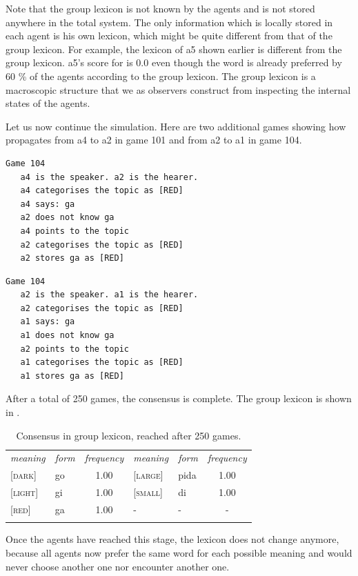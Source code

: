 Note that the group lexicon is not known by the agents
and is not stored anywhere in the 
total system. The only information which is locally stored in each 
agent is his own lexicon, which might be quite different from that 
of the group lexicon. For example, the lexicon of {\bfshape a5} shown earlier
is different from the group lexicon.
{\bfshape a5}'s score for  is 0.0
even though the word is already preferred by 60 \% of 
the agents according to the group lexicon. 
The group lexicon is a macroscopic structure that we
as observers construct from inspecting the internal 
states of the agents. 

Let us now continue the simulation. Here are two additional
games showing how  propagates from {\bfshape a4} to {\bfshape a2} in 
game 101 and from {\bfshape a2} to {\bfshape a1} in game 104. 
\begin{verbatim}
Game 104
   a4 is the speaker. a2 is the hearer. 
   a4 categorises the topic as [RED]
   a4 says: ga
   a2 does not know ga
   a4 points to the topic
   a2 categorises the topic as [RED]
   a2 stores ga as [RED]
\end{verbatim}
\begin{verbatim}
Game 104
   a2 is the speaker. a1 is the hearer. 
   a2 categorises the topic as [RED]
   a1 says: ga
   a1 does not know ga
   a2 points to the topic
   a1 categorises the topic as [RED]
   a1 stores ga as [RED]
\end{verbatim}
After a total of 250 games, the consensus is complete. 
The group lexicon is shown in . 

\begin{table}
\begin{center}
\begin{tabular}{l  l  c  l  l  c } \midrule 
{\itshape meaning} & {\itshape form} & {\itshape frequency} & {\itshape meaning} & {\itshape form} & {\itshape frequency}\\  
{}[\textsc{dark}]& go & 1.00 & [\textsc{large}]& pida & 1.00 \\  
{}[\textsc{light}]& gi & 1.00 & [\textsc{small}]& di & 1.00 \\  
{}[\textsc{red}]& ga & 1.00 & - & - & -  \\  
\lspbottomrule
\end{tabular}
\caption{\label{tab:t-mem5}Consensus in group lexicon, reached after 250 games.}
\end{center}
\end{table}
Once the agents have reached this stage, the lexicon does not 
change anymore, because all agents now prefer the same word for 
each possible meaning and would never choose another one
nor encounter another one. 

